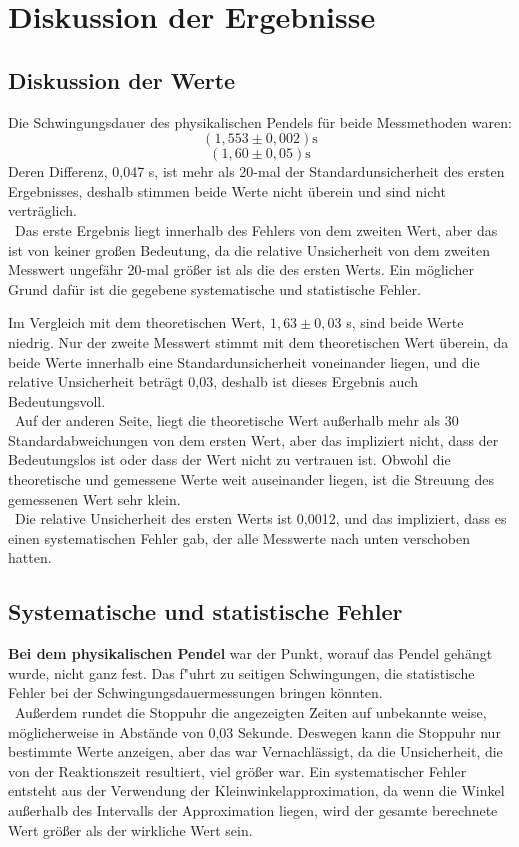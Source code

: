 \documentclass[11pt,a4paper]{article} %
\begin{document}
\section{Diskussion der Ergebnisse}
\subsection{Diskussion der Werte}
Die Schwingungsdauer des physikalischen Pendels für beide Messmethoden waren:
$$(1,553 \pm 0,002) \textrm{s}$$
$$(1,60 \pm 0,05) \textrm{s}$$
Deren Differenz, 0,047 s, ist mehr als 20-mal der Standardunsicherheit des ersten Ergebnisses, deshalb stimmen beide Werte nicht überein und sind nicht verträglich. 
\\\
Das erste Ergebnis liegt innerhalb des Fehlers von dem zweiten Wert, aber das ist von keiner großen Bedeutung, da die relative Unsicherheit von dem zweiten Messwert ungefähr 20-mal größer ist als die des ersten Werts. Ein möglicher Grund dafür ist die gegebene systematische und statistische Fehler. 

Im Vergleich mit dem theoretischen Wert, $1,63 \pm 0,03$ s, sind beide Werte niedrig. Nur der zweite Messwert stimmt mit dem theoretischen Wert überein, da beide Werte innerhalb eine Standardunsicherheit voneinander liegen, und die relative Unsicherheit beträgt 0,03, deshalb ist dieses Ergebnis auch Bedeutungsvoll. 
\\\
Auf der anderen Seite, liegt die theoretische Wert außerhalb mehr als 30 Standardabweichungen von dem ersten Wert, aber das impliziert nicht, dass der Bedeutungslos ist oder dass der Wert nicht zu vertrauen ist. Obwohl die theoretische und gemessene Werte weit auseinander liegen, ist die Streuung des gemessenen Wert sehr klein. 
\\\
Die relative Unsicherheit des ersten Werts ist 0,0012, und das impliziert, dass es einen systematischen Fehler gab, der alle Messwerte nach unten verschoben hatten. 

\subsection{Systematische und statistische Fehler}
\textbf{Bei dem physikalischen Pendel} war der Punkt, worauf das Pendel gehängt wurde, nicht ganz fest. Das f"uhrt zu seitigen Schwingungen, die  statistische Fehler bei der Schwingungsdauermessungen bringen könnten. 
\\\
Außerdem rundet die Stoppuhr die angezeigten Zeiten auf unbekannte weise, möglicherweise in Abstände von 0,03 Sekunde. Deswegen kann die Stoppuhr nur bestimmte Werte anzeigen, aber das war Vernachlässigt, da die Unsicherheit, die von der Reaktionszeit resultiert, viel größer war. 
Ein systematischer Fehler entsteht aus der Verwendung der Kleinwinkelapproximation, da wenn die Winkel außerhalb des Intervalls der Approximation liegen, wird der gesamte berechnete Wert größer als der wirkliche Wert sein.
\end{document}
